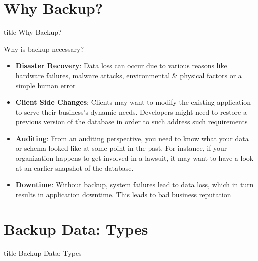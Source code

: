 \documentclass[aspectratio=169, xcolor=dvipsnames]{beamer}
\begin{document}
\section{Why Backup?}

\begin{frame}
  \vfill
  \centering
  \begin{beamercolorbox}[sep=8pt,center,shadow=true,rounded=true]{title}
    Why Backup?\par%
  \end{beamercolorbox}
  \vfill
\end{frame}

\begin{frame}{Why is backup necessary?}
    \begin{itemize}[<+->]
        \item \textbf{Disaster Recovery}: Data loss can occur due to various reasons like hardware failures, malware attacks, environmental \& physical factors or a simple human error
        \item \textbf{Client Side Changes}: Clients may want to modify the existing application to serve their business's dynamic needs. Developers might need to restore a previous version of the database in order to such address such requirements
        \item \textbf{Auditing}: From an auditing perspective, you need to know what your data or schema looked like at some point in the past. For instance, if your organization happens to get involved in a lawsuit, it may want to have a look at an earlier snapshot of the database.
        \item \textbf{Downtime}: Without backup, system failures lead to data loss, which in turn results in application downtime. This leads to bad business reputation
    \end{itemize}
\end{frame}

\section{Backup Data: Types}

\begin{frame}
  \vfill
  \centering
  \begin{beamercolorbox}[sep=8pt,center,shadow=true,rounded=true]{title}
    Backup Data: Types\par%
  \end{beamercolorbox}
  \vfill
\end{frame}
\end{document}
